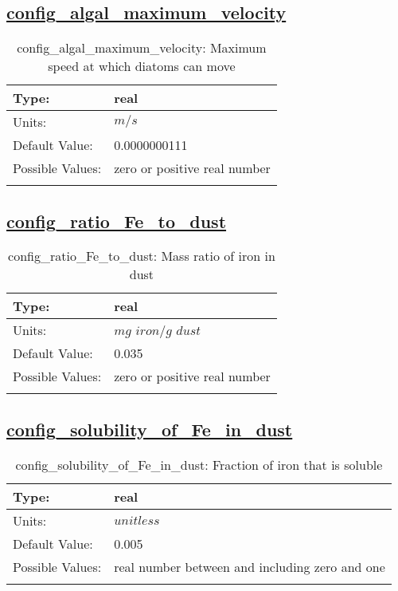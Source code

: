 \subsection[config\_algal\_maximum\_velocity]{\hyperref[sec:nm_tab_biogeochemistry]{config\_algal\_maximum\_velocity}}
\label{subsec:nm_sec_config_algal_maximum_velocity}
\begin{center}
\begin{longtable}{| p{2.0in} || p{4.0in} |}
    \hline
    Type: & real \\
    \hline
    Units: & $m/s$ \\
    \hline
    Default Value: & 0.0000000111 \\
    \hline
    Possible Values: & zero or positive real number  \\
    \hline
    \caption{config\_algal\_maximum\_velocity: Maximum speed at which diatoms can move}
\end{longtable}
\end{center}
\subsection[config\_ratio\_Fe\_to\_dust]{\hyperref[sec:nm_tab_biogeochemistry]{config\_ratio\_Fe\_to\_dust}}
\label{subsec:nm_sec_config_ratio_Fe_to_dust}
\begin{center}
\begin{longtable}{| p{2.0in} || p{4.0in} |}
    \hline
    Type: & real \\
    \hline
    Units: & $mg$ $iron/g$ $dust$ \\
    \hline
    Default Value: & 0.035 \\
    \hline
    Possible Values: & zero or positive real number \\
    \hline
    \caption{config\_ratio\_Fe\_to\_dust: Mass ratio of iron in dust}
\end{longtable}
\end{center}
\subsection[config\_solubility\_of\_Fe\_in\_dust]{\hyperref[sec:nm_tab_biogeochemistry]{config\_solubility\_of\_Fe\_in\_dust}}
\label{subsec:nm_sec_config_solubility_of_Fe_in_dust}
\begin{center}
\begin{longtable}{| p{2.0in} || p{4.0in} |}
    \hline
    Type: & real \\
    \hline
    Units: & $unitless$ \\
    \hline
    Default Value: & 0.005 \\
    \hline
    Possible Values: & real number between and including zero and one \\
    \hline
    \caption{config\_solubility\_of\_Fe\_in\_dust: Fraction of iron that is soluble}
\end{longtable}
\end{center}
